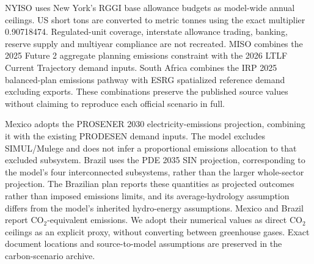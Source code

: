 \documentclass[pdflatex,sn-nature]{sn-jnl}
\begin{document}
NYISO uses New York's RGGI base allowance budgets as model-wide annual ceilings. US short tons are converted to metric tonnes using the exact multiplier 0.90718474. Regulated-unit coverage, interstate allowance trading, banking, reserve supply and multiyear compliance are not recreated. MISO combines the 2025 Future 2 aggregate planning emissions constraint with the 2026 LTLF Current Trajectory demand inputs. South Africa combines the IRP 2025 balanced-plan emissions pathway with ESRG spatialized reference demand excluding exports. These combinations preserve the published source values without claiming to reproduce each official scenario in full.

Mexico adopts the PROSENER 2030 electricity-emissions projection, combining it with the existing PRODESEN demand inputs. The model excludes SIMUL/Mulege and does not infer a proportional emissions allocation to that excluded subsystem. Brazil uses the PDE 2035 SIN projection, corresponding to the model's four interconnected subsystems, rather than the larger whole-sector projection. The Brazilian plan reports these quantities as projected outcomes rather than imposed emissions limits, and its average-hydrology assumption differs from the model's inherited hydro-energy assumptions. Mexico and Brazil report CO$_2$-equivalent emissions. We adopt their numerical values as direct CO$_2$ ceilings as an explicit proxy, without converting between greenhouse gases. Exact document locations and source-to-model assumptions are preserved in the carbon-scenario archive.
\end{document}
